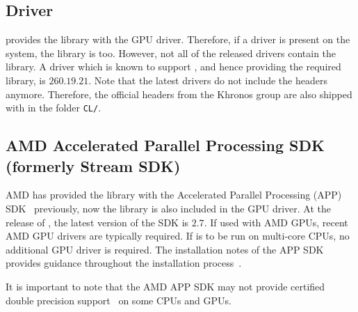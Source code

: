 
\subsection{\NVIDIA Driver}
\NVIDIA provides the {\OpenCL} library with the GPU driver. Therefore, if a 
\NVIDIA driver is present on the system, the library is too. However, 
not all of the released drivers contain the {\OpenCL} library. 
A driver which is known to support {\OpenCL}, and hence providing the required
library, is $260.19.21$. Note that the latest {\NVIDIA} drivers do not include
the {\OpenCL} headers anymore. Therefore, the official {\OpenCL} headers from
the Khronos group \cite{khronoscl} are also shipped with {\ViennaCL} in the
folder \lstinline|CL/|.

\subsection{AMD Accelerated Parallel Processing SDK (formerly Stream SDK)} \label{sec:opencl-on-ati}
AMD has provided the {\OpenCL} library with the Accelerated Parallel Processing (APP)
SDK~\cite{atistream} previously, now the {\OpenCL} library is also included in the GPU driver.
At the release of {\ViennaCLversion}, the latest version of the
SDK is $2.7$. If used with AMD GPUs, recent AMD GPU drivers are typically required. If {\ViennaCL} is to be run on multi-core CPUs,
no additional GPU driver is required. The installation notes
of the APP SDK provides guidance throughout the
installation process~\cite{atistreamdocu}. 


It is important to note that the AMD APP SDK may not provide {\OpenCL}
certified double precision support~\cite{atidouble} on some CPUs and GPUs. 


